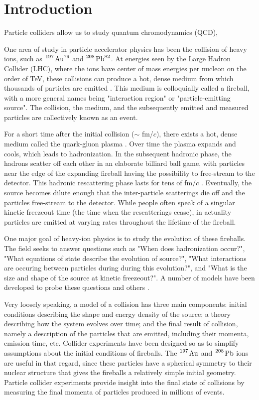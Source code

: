 \section{Introduction}
\label{sec:Introduction}

Particle colliders allow us to study quantum chromodynamics (QCD), 


One area of study in particle accelerator physics has been the collision of heavy ions, such as $\ce{^197 \mathrm{Au}^79}$ and $\ce{^208 \mathrm{Pb}^82}$.
At energies seen by the Large Hadron Collider (LHC), where the ions have center of mass energies per nucleon on the order of TeV, these collisions can produce a hot, dense medium from which thousands of particles are emitted \cite{...}.
This medium is colloquially called a fireball, with a more general names being "interaction region" or "particle-emitting source".
The collision, the medium, and the subsequently emitted and measured particles are collectively known as an event. 

For a short time after the initial collision ($\sim$ fm/$c$), there exists a hot, dense medium called the quark-gluon plasma \cite{...}.
Over time the plasma expands and cools, which leads to hadronization.
In the subsequent hadronic phase, the hadrons scatter off each other in an elaborate billiard ball game, with particles near the edge of the expanding fireball having the possibility to free-stream to the detector.
This hadronic rescattering phase lasts for tens of fm/$c$ \cite{...}.
Eventually, the source becomes dilute enough that the inter-particle scatterings die off and the particles free-stream to the detector.
While people often speak of a singular kinetic freezeout time (the time when the rescatterings cease), in actuality particles are emitted at varying rates throughout the lifetime of the fireball.


One major goal of heavy-ion physics is to study the evolution of these fireballs.
The field seeks to answer questions such as "When does hadronization occur?", "What equations of state describe the evolution of source?", "What interactions are occuring between particles during during this evolution?", and "What is the size and shape of the source at kinetic freezeout?".
A number of models have been developed to probe these questions and others \cite{...,...,...,...}.

Very loosely speaking, a model of a collision has three main components: initial conditions describing the shape and energy density of the source; a theory describing how the system evolves over time; and the final result of collision, namely a description of the particles that are emitted, including their momenta, emission time, etc.
Collider experiments have been designed so as to simplify assumptions about the initial conditions of fireballs.
The $\ce{^197 \mathrm{Au}}$ and $\ce{^208 \mathrm{Pb}}$ ions are useful in that regard, since these particles have a spherical symmetry to their nuclear structure that gives the fireballs a relatively simple initial geometry.
Particle collider experiments provide insight into the final state of collisions by measuring the final momenta of particles produced in millions of events.




